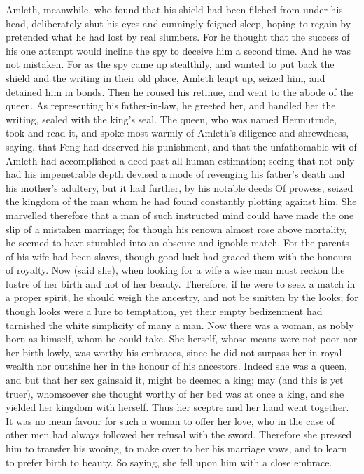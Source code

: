 \documentclass[10pt,a4paper]{report}
\begin{document}
Amleth, meanwhile, who found that his shield had been filched from under his head, deliberately shut his eyes and cunningly feigned sleep, hoping to regain by pretended what he had lost by real slumbers. For he thought that the success of his one attempt would incline the spy to deceive him a second time. And he was not mistaken. For as the spy came up stealthily, and wanted to put back the shield and the writing in their old place, Amleth leapt up, seized him, and detained him in bonds. Then he roused his retinue, and went to the abode of the queen. As representing his father-in-law, he greeted her, and handled her the writing, sealed with the king's seal. The queen, who was named Hermutrude, took and read it, and spoke most warmly of Amleth's diligence and shrewdness, saying, that Feng had deserved his punishment, and that the unfathomable wit of Amleth had accomplished a deed past all human estimation; seeing that not only had his impenetrable depth devised a mode of revenging his father's death and his mother's adultery, but it had further, by his notable deeds Of prowess, seized the kingdom of the man whom he had found constantly plotting against him. She marvelled therefore that a man of such instructed mind could have made the one slip of a mistaken marriage; for though his renown almost rose above mortality, he seemed to have stumbled into an obscure and ignoble match. For the parents of his wife had been slaves, though good luck had graced them with the honours of royalty. Now (said she), when looking for a wife a wise man must reckon the lustre of her birth and not of her beauty. Therefore, if he were to seek a match in a proper spirit, he should weigh the ancestry, and not be smitten by the looks; for though looks were a lure to temptation, yet their empty bedizenment had tarnished the white simplicity of many a man. Now there was a woman, as nobly born as himself, whom he could take. She herself, whose means were not poor nor her birth lowly, was worthy his embraces, since he did not surpass her in royal wealth nor outshine her in the honour of his ancestors. Indeed she was a queen, and but that her sex gainsaid it, might be deemed a king; may (and this is yet truer), whomsoever she thought worthy of her bed was at once a king, and she yielded her kingdom with herself. Thus her sceptre and her hand went together. It was no mean favour for such a woman to offer her love, who in the case of other men had always followed her refusal with the sword. Therefore she pressed him to transfer his wooing, to make over to her his marriage vows, and to learn to prefer birth to beauty. So saying, she fell upon him with a close embrace.\\
\end{document}
